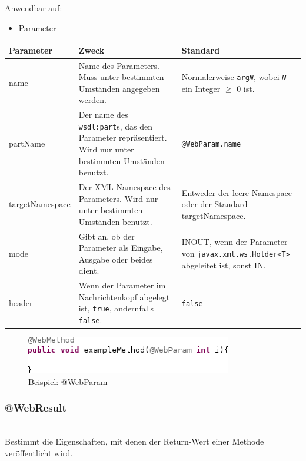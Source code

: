 \documentclass[runningheads]{llncs}
\newcommand{\anntabwidth}{\textwidth}
\begin{document}
      \noindent{}Anwendbar auf:
      \begin{itemize}
       \item Parameter\vfill
      \end{itemize}
    \begin{tabulary}{\anntabwidth}{|l|L|L|}
    \hline
    \textbf{Parameter} & \textbf{Zweck} & \textbf{Standard} \\
    \hline
      name &
      Name des Parameters. Muss unter bestimmten Umständen angegeben werden. &
      Normalerweise \texttt{arg\textit{N}}, wobei \texttt{\textit{N}} ein Integer $\geq$ 0 ist. \\
    \hline
      partName &
      Der name des \texttt{wsdl:part}s, das den Parameter repräsentiert. Wird nur unter bestimmten
      Umständen benutzt. &
      \texttt{@WebParam.name} \\
    \hline
      targetNamespace &
      Der XML-Namespace des Parameters. Wird nur unter bestimmten Umständen benutzt. &
      Entweder der leere Namespace oder der Standard-targetNamespace. \\
    \hline
      mode &
      Gibt an, ob der Parameter als Eingabe, Ausgabe oder beides dient. &
      INOUT, wenn der Parameter von \texttt{javax.xml.ws.Holder<T>} abgeleitet ist, sonst IN. \\
    \hline
      header &
      Wenn der Parameter im Nachrichtenkopf abgelegt ist, \texttt{true}, andernfalls
      \texttt{false}. &
      \texttt{false} \\
    \hline
    \end{tabulary} \vfill
    \begin{figure}[ht!]
      \centering
      \includegraphics[width=0.8\textwidth]{../images/AtWebParam.png}
      \caption{Beispiel: @WebParam}
      \label{fig:wp}
    \end{figure} \vfill

    \subsubsection{@WebResult}\ \\
      Bestimmt die Eigenschaften, mit denen der Return-Wert einer Methode veröffentlicht wird.
\end{document}
